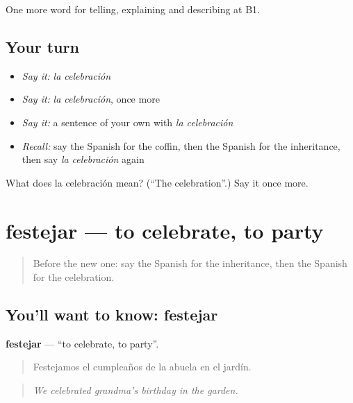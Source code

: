 \begin{grammarlens}[title={What you've built}]
One more word for telling, explaining and describing at B1.
\end{grammarlens}

\subsection*{Your turn}
\begin{itemize}
\raggedright
  \item \emph{Say it:} \emph{la celebración}
  \item \emph{Say it:} \emph{la celebración}, once more
  \item \emph{Say it:} a sentence of your own with \emph{la celebración}
  \item \emph{Recall:} say the Spanish for the coffin, then the Spanish for the inheritance, then say \emph{la celebración} again
\end{itemize}

\begin{tcolorbox}[breakable,colback=teal!4,colframe=teal!35!black,title={Before you move on}]
What does la celebración mean? (\textquotedblleft{}The celebration\textquotedblright{}.) Say it once more.
\end{tcolorbox}
\section[festejar]{festejar — to celebrate, to party}

\label{lesson:ES-C558-festejar}



\begin{quote}
Before the new one: say the Spanish for the inheritance, then the Spanish for the celebration.
\end{quote}

\subsection*{You'll want to know: festejar}
\textbf{festejar} — \textquotedblleft{}to celebrate, to party\textquotedblright{}.

\begin{quote}
Festejamos el cumpleaños de la abuela en el jardín.
\end{quote}

\begin{quote}
\emph{We celebrated grandma's birthday in the garden.}
\end{quote}

